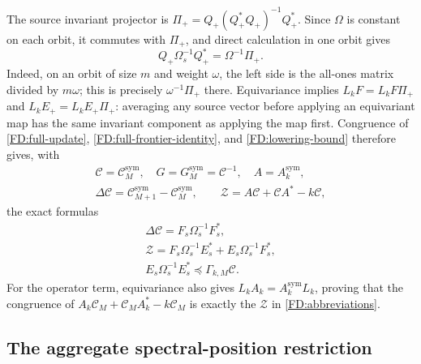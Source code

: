 The source invariant projector is
\(\Pi_+=Q_+(Q_+^*Q_+)^{-1}Q_+^*\).  Since \(\Omega\) is constant
on each orbit, it commutes with \(\Pi_+\), and direct calculation in
one orbit gives
\[
Q_+\Omega_s^{-1}Q_+^*=\Omega^{-1}\Pi_+.
\]
Indeed, on an orbit of size \(m\) and weight \(\omega\), the left
side is the all-ones matrix divided by \(m\omega\); this is precisely
\(\omega^{-1}\Pi_+\) there.  Equivariance implies
\(L_kF=L_kF\Pi_+\) and \(L_kE_+=L_kE_+\Pi_+\): averaging any
source vector before applying an equivariant map has the same invariant
component as applying the map first.  Congruence of
\eqref{FD:full-update}, \eqref{FD:full-frontier-identity}, and
\eqref{FD:lowering-bound} therefore gives, with
\begin{equation}
\begin{gathered}
\mathcal C=\mathcal C_M^{\mathrm{sym}},\quad
G=G_M^{\mathrm{sym}}=\mathcal C^{-1},\quad A=A_k^{\mathrm{sym}},\\
\Delta\mathcal C=\mathcal C_{M+1}^{\mathrm{sym}}-
\mathcal C_M^{\mathrm{sym}},\qquad
\mathcal Z=A\mathcal C+\mathcal CA^*-k\mathcal C,
\end{gathered}
\tag{FD.26}\label{FD:abbreviations}
\end{equation}
the exact formulas
\begin{equation}
\begin{gathered}
\Delta\mathcal C=F_s\Omega_s^{-1}F_s^*,\\
\mathcal Z=F_s\Omega_s^{-1}E_s^*+E_s\Omega_s^{-1}F_s^*,\\
E_s\Omega_s^{-1}E_s^*\preceq\Gamma_{k,M}\mathcal C.
\end{gathered}
\tag{FD.27}\label{FD:restricted-identities}
\end{equation}
For the operator term, equivariance also gives
\(L_kA_k=A_k^{\mathrm{sym}}L_k\), proving that the congruence of
\(A_k\mathcal C_M+\mathcal C_MA_k^*-k\mathcal C_M\) is exactly the
\(\mathcal Z\) in \eqref{FD:abbreviations}.

\subsection{The aggregate spectral-position restriction}

